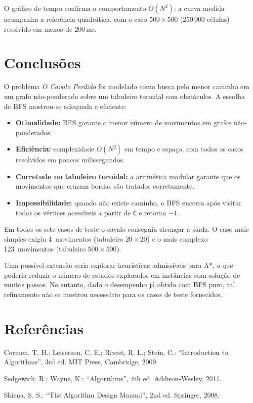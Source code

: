 \documentclass[12pt]{article}
\begin{document}
O gráfico de tempo confirma o comportamento $O(N^2)$: a curva medida acompanha a
referência quadrática, com o caso $500 \times 500$ (250\,000 células) resolvido em
menos de 200\,ms.

\newpage

\section*{Conclusões}

O problema \emph{O Cavalo Perdido} foi modelado como busca pelo menor caminho em um
grafo não-ponderado sobre um tabuleiro toroidal com obstáculos. A escolha de BFS
mostrou-se adequada e eficiente:

\begin{itemize}[leftmargin=2.2em,itemsep=0.4em]
  \item \textbf{Otimalidade:} BFS garante o menor número de movimentos em grafos
        não-ponderados.
  \item \textbf{Eficiência:} complexidade $O(N^2)$ em tempo e espaço, com todos os
        casos resolvidos em poucos milissegundos.
  \item \textbf{Corretude no tabuleiro toroidal:} a aritmética modular garante que
        os movimentos que cruzam bordas são tratados corretamente.
  \item \textbf{Impossibilidade:} quando não existe caminho, o BFS encerra após
        visitar todos os vértices acessíveis a partir de \texttt{C} e retorna $-1$.
\end{itemize}

Em todos os sete casos de teste o cavalo conseguiu alcançar a saída. O caso mais
simples exigiu 4~movimentos (tabuleiro $20 \times 20$) e o mais complexo
123~movimentos (tabuleiro $500 \times 500$).

Uma possível extensão seria explorar heurísticas admissíveis para A*, o que poderia
reduzir o número de estados explorados em instâncias com solução de muitos passos.
No entanto, dado o desempenho já obtido com BFS puro, tal refinamento não se mostrou
necessário para os casos de teste fornecidos.

\newpage

\section*{Referências}

\begin{enumerate}[label={[\arabic*]},leftmargin=2.4em,itemsep=0.3em]
\item Cormen, T. H.; Leiserson, C. E.; Rivest, R. L.; Stein, C.:
      ``Introduction to Algorithms'', 3rd ed. MIT Press, Cambridge, 2009.
\item Sedgewick, R.; Wayne, K.:
      ``Algorithms'', 4th ed. Addison-Wesley, 2011.
\item Skiena, S. S.:
      ``The Algorithm Design Manual'', 2nd ed. Springer, 2008.
\end{enumerate}
\end{document}
